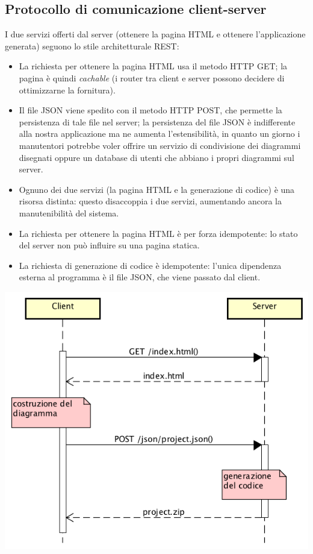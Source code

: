 


\subsection{Protocollo di comunicazione client-server} \label{sec:arch_proto}
I due servizi offerti dal server (ottenere la pagina HTML e ottenere l'applicazione generata) seguono lo stile architetturale REST:
\begin{itemize}
	\item La richiesta per ottenere la pagina HTML usa il metodo HTTP GET; la pagina è quindi \emph{cachable} (i router tra client e server possono decidere di ottimizzarne la fornitura).
	\item Il file JSON viene spedito con il metodo HTTP POST, che permette la persistenza di tale file nel server; la persistenza del file JSON è indifferente alla nostra applicazione ma ne aumenta l'estensibilità, in quanto un giorno i manutentori potrebbe voler offrire un servizio di condivisione dei diagrammi disegnati oppure un database di utenti che abbiano i propri diagrammi sul server.
	\item Ognuno dei due servizi (la pagina HTML e la generazione di codice) è una risorsa distinta: questo disaccoppia i due servizi, aumentando ancora la manutenibilità del sistema.
	\item La richiesta per ottenere la pagina HTML è per forza idempotente: lo stato del server non può influire su una pagina statica.
	\item La richiesta di generazione di codice è idempotente: l'unica dipendenza esterna al programma è il file JSON, che viene passato dal client.
\end{itemize}

\begin{center}
	\includegraphics[scale=0.66]{img/http}
\end{center}

